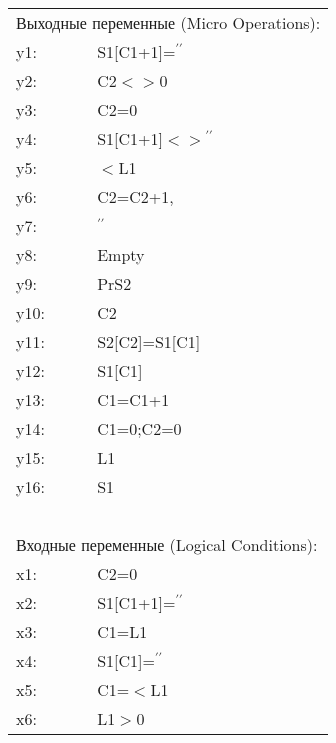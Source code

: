 \begin{multicols}{2}
{\vspace*{24pt}
                               \begin{center}
                               \begin{tabular}{ll}
                               \multicolumn{2}{l}{Выходные переменные (Micro Operations):}\\
                               y1:& S1[C1+1]=$^{\prime\prime}$\\ 
                               y2: & C2$<>$0 \\
                               y3:& C2=0 \\
                               y4: & S1[C1+1]$<>$$^{\prime\prime}$\\ 
                               y5: & $<$L1 \\
                               y6: & C2=C2+1, \\
                               y7: &$^{\prime\prime}$\\ 
                               y8: & Empty\\
                               y9: & PrS2 \\
                               y10: & C2\\ 
                               y11: & S2[C2]=S1[C1] \\
                               y12: & S1[C1] \\
                               y13: &C1=C1+1 \\
                               y14: &C1=0;C2=0 \\
                               y15: &L1\\
                               y16: &S1\\
                               \multicolumn{2}{c}{\ }\\
                               \multicolumn{2}{l}{Входные переменные (Logical Conditions):}\\
                               x1: & C2=0 \\
                               x2: & S1[C1+1]=$^{\prime\prime}$\\ 
                               x3: & C1=L1 \\
                               x4: &S1[C1]=$^{\prime\prime}$\\ 
                               x5: & C1=$<$L1 \\
                               x6: &L1$>$0 
                               \end{tabular}
                               \end{center}
                               
}
\end{multicols}
